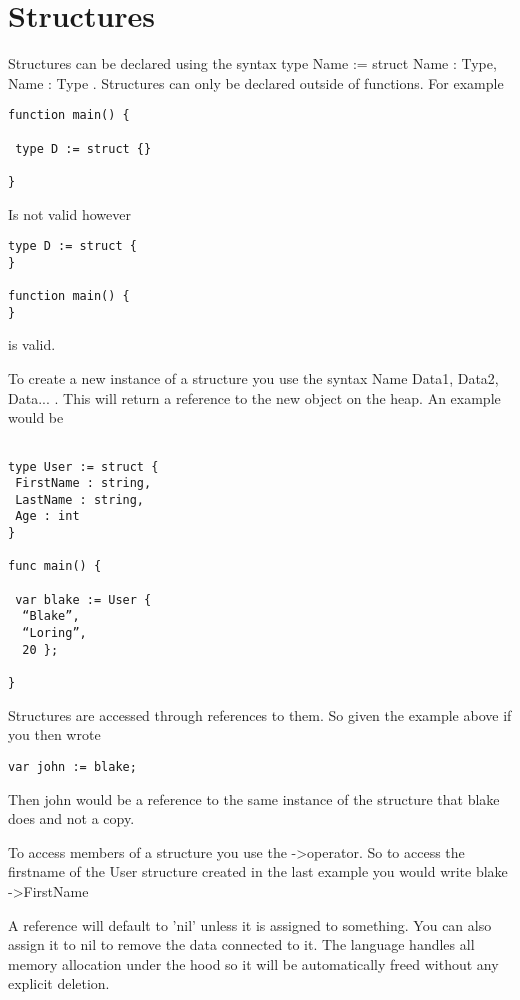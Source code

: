 \documentclass[]{final_report}
\begin{document}
\section{Structures}

Structures can be declared using the syntax type Name := struct { Name : Type, Name : Type }. Structures can only be declared outside of functions. For example

\begin{verbatim}
function main() {

 type D := struct {}

}
\end{verbatim}

Is not valid however

\begin{verbatim}
type D := struct {
}

function main() {
}
\end{verbatim}

is valid.

To create a new instance of a structure you use the syntax Name{ Data1, Data2, Data... }. This will return a reference to the new object on the heap. An example would be

\begin{verbatim}

type User := struct {
 FirstName : string,
 LastName : string,
 Age : int
}

func main() {
 
 var blake := User {
  “Blake”,
  “Loring”, 
  20 };

}
\end{verbatim}

Structures are accessed through references to them. So given the example above if you then wrote

\begin{verbatim}
var john := blake;
\end{verbatim}

Then john would be a reference to the same instance of the structure that blake does and not a copy. 

To access members of a structure you use the -\textgreater operator. So to access the firstname of the User structure created in the last example you would write blake -\textgreater FirstName 

A reference will default to 'nil' unless it is assigned to something. You can also assign it to nil to remove the data connected to it. The language handles all memory allocation under the hood so it will be automatically freed without any explicit deletion.
\end{document}
